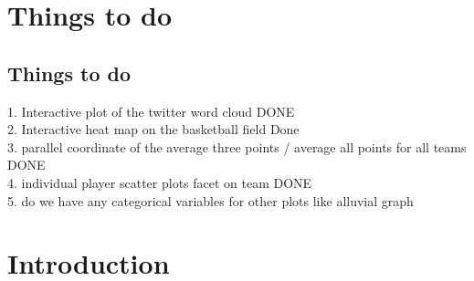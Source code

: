 \documentclass[11pt,fleqn]{book} %
\begin{document}


\pagestyle{empty} %

\renewcommand\contentsname{Table of Contents}
\renewcommand{\bibname}{Bibliographie}
\tableofcontents%


\pagestyle{fancy} %



\chapter{Things to do}

\section{Things to do}

\vspace{1em}
1. Interactive plot of the twitter word cloud DONE\\
2. Interactive heat map on the basketball field  Done\\
3. parallel coordinate of the average three points / average all points for all teams  DONE\\
4. individual player scatter plots facet on team DONE\\
5. do we have any categorical variables for other plots like alluvial graph





\chapter{Introduction}
\end{document}
